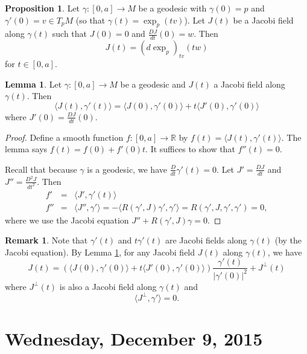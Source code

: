 \documentclass{amsart}
\numberwithin{equation}{section}
\newcommand{\bR}{\mathbb{R}}
\theoremstyle{definition}
\newtheorem{remark}[definition]{Remark}
\theoremstyle{theorem}
\newtheorem{proposition}[definition]{Proposition}
\newtheorem{lemma}[definition]{Lemma}
\begin{document}
\begin{proposition}
Let $\gamma : [0,a] \to M$ be a geodesic with $\gamma(0) = p$ and $\gamma'(0) = v \in T_pM$ (so that
$\gamma(t)=\exp_p(tv)$).
Let  $J(t)$ be a Jacobi field along $\gamma(t)$ such that $J(0) = 0$ and $\frac{DJ}{dt}(0) = w$. Then 
\[
J(t) = (d \exp_p)_{tv}(tw)
\]
for $t \in [0,a]$. 
\end{proposition}

\begin{lemma}\label{jacobi-tangent}
Let $\gamma : [0,a] \to M$ be a geodesic and $J(t)$ a Jacobi field along $\gamma(t)$. Then
\[
\langle J(t), \gamma'(t) \rangle = \langle J(0), \gamma'(0) \rangle + t \langle J'(0), \gamma'(0) \rangle
\]
where $J'(0) = \frac{DJ}{dt}(0)$. 
\end{lemma}

\begin{proof} Define a smooth function $f:[0,a]\to \bR$ by 
$f(t) = \langle J(t), \gamma'(t) \rangle$. 
The lemma says $f(t)=f(0)+ f'(0)t$. It suffices to show that $f''(t)=0$.
 
Recall that because $\gamma$ is a geodesic, we have $\frac{D}{dt}\gamma'(t) = 0$. 
Let $J'=\frac{DJ}{dt}$ and $J''=\frac{D^2J}{dt^2}$. Then
\begin{eqnarray*}
f' &=& \langle J', \gamma'(t) \rangle\\
f'' &=& \langle J'', \gamma' \rangle =  - \langle R(\gamma', J)\gamma', \gamma' \rangle = R(\gamma', J, \gamma', \gamma') = 0,
\end{eqnarray*}
where we use the Jacobi equation $J''+R(\gamma',J)\gamma=0$. 
\end{proof}

\begin{remark}
Note that $\gamma'(t)$ and $t\gamma'(t)$ are Jacobi fields along $\gamma(t)$ (by the Jacobi equation). 
By Lemma \ref{jacobi-tangent}, for any Jacobi field $J(t)$ along $\gamma(t)$, we have 
\[
J(t) = \left(\langle J(0), \gamma'(0) \rangle + t\langle J'(0), \gamma'(0) \rangle \right) \frac{\gamma'(t)}{|\gamma'(0)|^2} + J^\perp(t)
\]
where $J^\perp(t)$ is also a Jacobi field along $\gamma(t)$ and 
\[
\langle J^\perp, \gamma' \rangle = 0.
\]
\end{remark}






\section{Wednesday, December 9, 2015}
\end{document}
